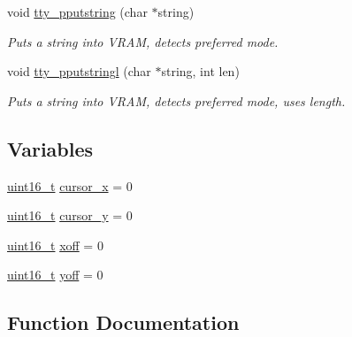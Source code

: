 \begin{DoxyCompactItemize}
void \hyperlink{a00140_ade960b1320324706aac6c00cc6b1b2fe_ade960b1320324706aac6c00cc6b1b2fe}{tty\+\_\+pputstring} (char $\ast$string)
\begin{DoxyCompactList}\small\item\em Puts a string into V\+R\+AM, detects preferred mode. \end{DoxyCompactList}\item 
void \hyperlink{a00140_abaf93f9e56ddb7b10462070f59e534e4_abaf93f9e56ddb7b10462070f59e534e4}{tty\+\_\+pputstringl} (char $\ast$string, int len)
\begin{DoxyCompactList}\small\item\em Puts a string into V\+R\+AM, detects preferred mode, uses length. \end{DoxyCompactList}\end{DoxyCompactItemize}
\subsection*{Variables}
\begin{DoxyCompactItemize}
\item 
\hyperlink{a00116_a273cf69d639a59973b6019625df33e30_a273cf69d639a59973b6019625df33e30}{uint16\+\_\+t} \hyperlink{a00140_ae69604af0f9bd5fca2a016d0aa1ba7e1_ae69604af0f9bd5fca2a016d0aa1ba7e1}{cursor\+\_\+x} = 0
\item 
\hyperlink{a00116_a273cf69d639a59973b6019625df33e30_a273cf69d639a59973b6019625df33e30}{uint16\+\_\+t} \hyperlink{a00140_a0301c5492919c401c2c1ecf52af709b0_a0301c5492919c401c2c1ecf52af709b0}{cursor\+\_\+y} = 0
\item 
\hyperlink{a00116_a273cf69d639a59973b6019625df33e30_a273cf69d639a59973b6019625df33e30}{uint16\+\_\+t} \hyperlink{a00140_abaa0d20f0e52ce0d3a7d706f6ac16266_abaa0d20f0e52ce0d3a7d706f6ac16266}{xoff} = 0
\item 
\hyperlink{a00116_a273cf69d639a59973b6019625df33e30_a273cf69d639a59973b6019625df33e30}{uint16\+\_\+t} \hyperlink{a00140_a1a7539764d0ae8cd06ce45c62cf92bca_a1a7539764d0ae8cd06ce45c62cf92bca}{yoff} = 0
\end{DoxyCompactItemize}


\subsection{Function Documentation}
\mbox{\label{a00140_aff4bc17c602603d120756f52e18ebb96_aff4bc17c602603d120756f52e18ebb96}} 
